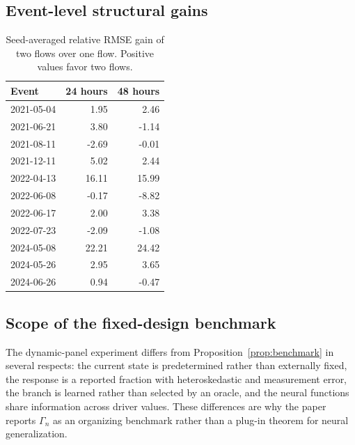 \subsection{Event-level structural gains}
\begin{table}[h]
\centering
\caption{Seed-averaged relative RMSE gain of two flows over one flow. Positive values favor two flows.}
\small
\begin{tabular}{@{}lrr@{}}
\toprule
Event & 24 hours & 48 hours\\
\midrule
2021-05-04 & 1.95 & 2.46\\
2021-06-21 & 3.80 & -1.14\\
2021-08-11 & -2.69 & -0.01\\
2021-12-11 & 5.02 & 2.44\\
2022-04-13 & 16.11 & 15.99\\
2022-06-08 & -0.17 & -8.82\\
2022-06-17 & 2.00 & 3.38\\
2022-07-23 & -2.09 & -1.08\\
2024-05-08 & 22.21 & 24.42\\
2024-05-26 & 2.95 & 3.65\\
2024-06-26 & 0.94 & -0.47\\
\bottomrule
\end{tabular}
\end{table}

\subsection{Scope of the fixed-design benchmark}
The dynamic-panel experiment differs from Proposition~\ref{prop:benchmark} in several respects: the current state is predetermined rather than externally fixed, the response is a reported fraction with heteroskedastic and measurement error, the branch is learned rather than selected by an oracle, and the neural functions share information across driver values. These differences are why the paper reports $\Gamma_n$ as an organizing benchmark rather than a plug-in theorem for neural generalization.
